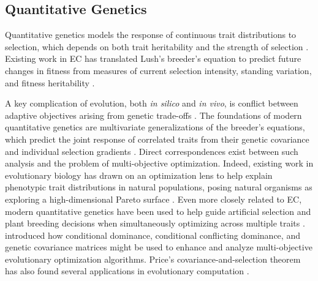 \subsection{Quantitative Genetics}
\label{sec:quantitative-genetics}

Quantitative genetics models the response of continuous trait distributions to selection, which depends on both trait heritability and the strength of selection \citep{lush1945animal}.
Existing work in EC has translated Lush's breeder's equation to predict future changes in fitness from measures of current selection intensity, standing variation, and fitness heritability \citep{mhlenbein1997equation}. %

A key complication of evolution, both \textit{in silico} and \textit{in vivo}, is conflict between adaptive objectives arising from genetic trade-offs \citep{garland2022trade,deb2002fast}.
The foundations of modern quantitative genetics are multivariate generalizations of the breeder's equations, which predict the joint response of correlated traits from their genetic covariance and individual selection gradients \citep{lande1979quantitative}.
Direct correspondences exist between such analysis and the problem of multi-objective optimization.
Indeed, existing work in evolutionary biology has drawn on an optimization lens to help explain phenotypic trait distributions in natural populations, posing natural organisms as exploring a high-dimensional Pareto surface \citep{shoval2012evolutionary}.
Even more closely related to EC, modern quantitative genetics have been used to help guide artificial selection and plant breeding decisions when simultaneously optimizing across multiple traits \citep{jesusceronrojas2026nonlinear,olivoto2021mgidi}. %
\citet{santana2011quantitative} introduced how conditional dominance, conditional conflicting dominance, and genetic covariance matrices might be used to enhance and analyze multi-objective evolutionary optimization algorithms. %
Price's covariance-and-selection theorem \citep{price1970selection} has also found several applications in evolutionary computation \citep{altenberg1995schema,bassett2004looking,bassett2005applying,potter2003visualizing,altenberg1994evolution,card2008towards,wang2006estimation}.  %
